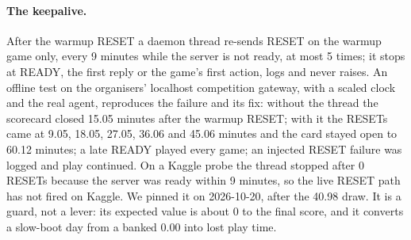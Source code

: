 \paragraph{The keepalive.}
After the warmup RESET a daemon thread re-sends RESET on the warmup game only, every 9 minutes while the server is not ready, at most 5 times; it stops at READY, the first reply or the game's first action, logs and never raises. %
An offline test on the organisers' localhost competition gateway, with a scaled clock and the real agent, reproduces the failure and its fix: without the thread the scorecard closed 15.05 minutes after the warmup RESET; with it the RESETs came at 9.05, 18.05, 27.05, 36.06 and 45.06 minutes and the card stayed open to 60.12 minutes; a late READY played every game; an injected RESET failure was logged and play continued. %
On a Kaggle probe the thread stopped after 0 RESETs because the server was ready within 9 minutes, so the live RESET path has not fired on Kaggle. %
We pinned it on 2026-10-20, after the 40.98 draw. It is a guard, not a lever: its expected value is about 0 to the final score, and it converts a slow-boot day from a banked 0.00 into lost play time. %
